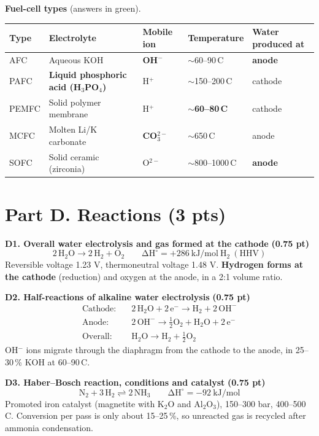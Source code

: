 \documentclass[11pt,a4paper]{article}
\newcommand{\degC}{\,\textdegree C}
\newcommand{\fillin}[1]{\textcolor{ans}{\textbf{#1}}}
\newcommand{\pts}[1]{\hfill{\normalsize\textbf{(#1)}}}
\newcommand{\rxn}[1]{\[\mathrm{#1}\]}
\begin{document}
\textbf{Fuel-cell types} (answers in green).

{\small
\renewcommand{\arraystretch}{1.35}
\begin{tabularx}{\linewidth}{@{}lYYYY@{}}
\toprule
\textbf{Type} & \textbf{Electrolyte} & \textbf{Mobile ion} & \textbf{Temperature} & \textbf{Water produced at}\\
\midrule
AFC & Aqueous KOH & \fillin{OH$^-$} & $\sim$60--90\degC & \fillin{anode}\\
PAFC & \fillin{Liquid phosphoric acid (H$_3$PO$_4$)} & H$^+$ & $\sim$150--200\degC & cathode\\
PEMFC & Solid polymer membrane & H$^+$ & \fillin{$\sim$60--80\degC} & cathode\\
MCFC & Molten Li/K carbonate & \fillin{CO$_3^{2-}$} & $\sim$650\degC & anode\\
SOFC & Solid ceramic (zirconia) & O$^{2-}$ & $\sim$800--1000\degC & \fillin{anode}\\
\bottomrule
\end{tabularx}}

\section{Part D. Reactions \pts{3 pts}}

\textbf{D1. Overall water electrolysis and gas formed at the cathode} \pts{0.75 pt}
\rxn{2\,H_2O \longrightarrow 2\,H_2 + O_2 \qquad \Delta H^\circ = +286\ kJ/mol\ H_2\ (HHV)}
Reversible voltage 1.23 V, thermoneutral voltage 1.48 V. \textbf{Hydrogen forms at the cathode} (reduction) and oxygen
at the anode, in a 2:1 volume ratio.

\textbf{D2. Half-reactions of alkaline water electrolysis} \pts{0.75 pt}
\begin{align*}
\text{Cathode:}\quad & \mathrm{2\,H_2O + 2\,e^- \longrightarrow H_2 + 2\,OH^-}\\
\text{Anode:}\quad & \mathrm{2\,OH^- \longrightarrow \tfrac{1}{2}O_2 + H_2O + 2\,e^-}\\
\text{Overall:}\quad & \mathrm{H_2O \longrightarrow H_2 + \tfrac{1}{2}O_2}
\end{align*}
OH$^-$ ions migrate through the diaphragm from the cathode to the anode, in 25--30\,\% KOH at 60--90\degC.

\textbf{D3. Haber--Bosch reaction, conditions and catalyst} \pts{0.75 pt}
\rxn{N_2 + 3\,H_2 \rightleftharpoons 2\,NH_3 \qquad \Delta H^\circ = -92\ kJ/mol}
Promoted iron catalyst (magnetite with K$_2$O and Al$_2$O$_3$), 150--300 bar, 400--500\degC. Conversion per pass is
only about 15--25\,\%, so unreacted gas is recycled after ammonia condensation.
\end{document}
